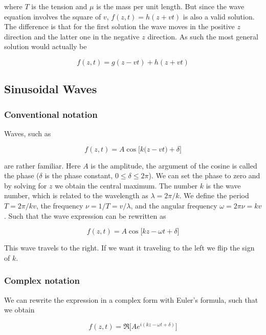 \documentclass[a4paper]{article}
\begin{document}
where $T$ is the tension and $\mu$ is the mass per unit length. But since the wave equation involves the square of $v$, $f(z, t)=h(z+vt)$ is also a valid solution. The difference is that for the first solution the wave moves in the positive $z$ direction and the latter one in the negative $z$ direction. As such the most general solution would actually be

\begin{equation}
    f(z, t)= g(z-vt) + h(z+vt)
\end{equation}

\subsection{Sinusoidal Waves}

\subsubsection*{Conventional notation}

Waves, such as

\begin{equation}
    f(z, t) = A\cos\big[k\big(z-vt\big)+\delta\big]
\end{equation}

are rather familiar. Here $A$ is the amplitude, the argument of the cosine is called the phase ($\delta$ is the phase constant, $0\le\delta\le 2\pi$). We can set the phase to zero and by solving for $z$ we obtain the central maximum. The number $k$ is the wave number, which is related to the wavelength as $\lambda=2\pi/k$. We define the period $T=2\pi/kv$, the frequency $\nu=1/T=v/\lambda$, and the angular frequency $\omega=2\pi \nu=kv$. Such that the wave expression can be rewritten as

\begin{equation}
    f(z, t) = A\cos\big[kz-\omega t + \delta]
\end{equation}

This wave travels to the right. If we want it traveling to the left we flip the sign of $k$. 

\subsubsection*{Complex notation}

We can rewrite the expression in a complex form with Euler's formula, such that we obtain

\begin{equation}
    f(z, t) = \Re\big[Ae^{i(kz-\omega t+\delta)}\big]
\end{equation}
\end{document}
